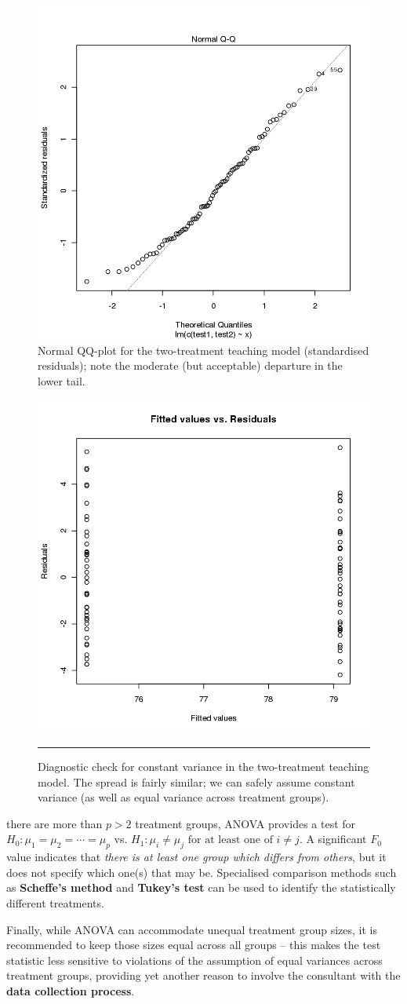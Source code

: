 \begin{figure}[!t]
\centering
  \includegraphics[width=0.475\linewidth]{Images/testA3.png}
  \caption[\small Normal QQ-plot for the two-treatment teaching model]{\small Normal QQ-plot for the two-treatment teaching model (standardised residuals); note the moderate (but acceptable) departure in the lower tail.}
  \label{fig:testA3}
\end{figure}
\begin{figure}[!t]
\centering
  \includegraphics[width=0.475\linewidth]{Images/testA4.png}
  \caption[\small Diagnostic check for constant variance in the two-treatment teaching model]{\small Diagnostic check for constant variance in the two-treatment teaching model. The spread is fairly similar; we can safely assume constant variance (as well as equal variance across treatment groups).}
  \label{fig:testA4}\hrule
\end{figure}
 there are more than $p>2$ treatment groups, ANOVA provides a test for $H_{0}: \mu_{1} = \mu_{2} = \cdots = \mu_{p}$ vs. $H_{1}: \mu_{i} \neq \mu_{j} \text{ for at least one of } i \neq j$. A significant $F_0$ value indicates that \textit{there is at least one group which differs from others}, but it does not specify which one(s) that may be. Specialised comparison methods such as \textbf{Scheffe's method} and \textbf{Tukey's test} can be used to identify the statistically different treatments.\par Finally, while ANOVA can accommodate unequal treatment group sizes, it is recommended to keep those sizes equal across all groups -- this  makes the test statistic less sensitive to violations of the assumption of equal variances across treatment groups, providing yet another reason to involve the consultant with the \textbf{data collection process}.

